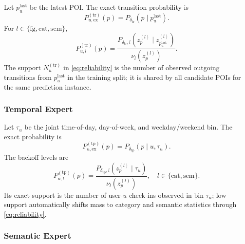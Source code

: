 \documentclass[journal]{IEEEtran}
\begin{document}
Let $p_u^{\mathrm{last}}$ be the latest POI.
The exact transition probability is
\begin{equation}
P_{u,\mathrm{ex}}^{(\mathrm{tr})}(p)
=
P_{\delta_{\mathrm{tr}}}(p\mid p_u^{\mathrm{last}}).
\label{eq:transition_exact}
\end{equation}
For $l\in\{\mathrm{fg},\mathrm{cat},\mathrm{sem}\}$,
\begin{equation}
P_{u,l}^{(\mathrm{tr})}(p)
=
\frac{
P_{\delta_{\mathrm{tr}},l}
(z_p^{(l)}\mid z_{p_u^{\mathrm{last}}}^{(l)})
}{
\nu_l(z_p^{(l)})
}.
\label{eq:transition_backoff}
\end{equation}
The support $N_u^{(\mathrm{tr})}$ in \eqref{eq:reliability} is the number of
observed outgoing transitions from $p_u^{\mathrm{last}}$ in the training
split; it is shared by all candidate POIs for the same prediction instance.

\subsubsection{Temporal Expert}

Let $\tau_u$ be the joint time-of-day, day-of-week, and weekday/weekend bin.
The exact probability is
\begin{equation}
P_{u,\mathrm{ex}}^{(\mathrm{tp})}(p)
=
P_{\delta_{\mathrm{tp}}}(p\mid u,\tau_u).
\label{eq:temporal_exact}
\end{equation}
The backoff levels are
\begin{equation}
P_{u,l}^{(\mathrm{tp})}(p)
=
\frac{P_{\delta_{\mathrm{tp}},l}(z_p^{(l)}\mid\tau_u)}
{\nu_l(z_p^{(l)})},
\quad
l\in\{\mathrm{cat},\mathrm{sem}\}.
\label{eq:temporal_backoff}
\end{equation}
Its exact support is the number of user-$u$ check-ins observed in bin
$\tau_u$; low support automatically shifts mass to category and semantic
statistics through \eqref{eq:reliability}.

\subsubsection{Semantic Expert}
\end{document}
